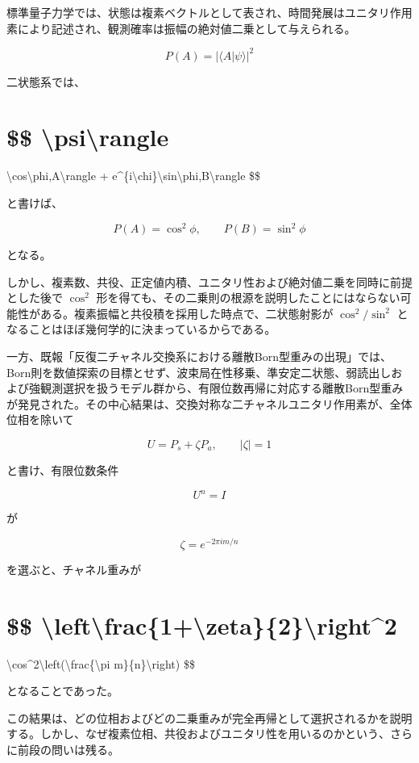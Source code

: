 \documentclass[
  a4paper,
  10pt]{article}
\begin{document}
標準量子力学では、状態は複素ベクトルとして表され、時間発展はユニタリ作用素により記述され、観測確率は振幅の絶対値二乗として与えられる。

\[
P(A)=|\langle A|\psi\rangle|^2
\]

二状態系では、

\section{\$\$
\textbar\textbackslash psi\textbackslash rangle}\label{-psirangle}

\textbackslash cos\textbackslash phi,\textbar A\textbackslash rangle +
e\^{}\{i\textbackslash chi\}\textbackslash sin\textbackslash phi,\textbar B\textbackslash rangle
\$\$

と書けば、

\[
P(A)=\cos^2\phi,
\qquad
P(B)=\sin^2\phi
\]

となる。

しかし、複素数、共役、正定値内積、ユニタリ性および絶対値二乗を同時に前提とした後で
\(\cos^2\)
形を得ても、その二乗則の根源を説明したことにはならない可能性がある。複素振幅と共役積を採用した時点で、二状態射影が
\(\cos^2/\sin^2\) となることはほぼ幾何学的に決まっているからである。

一方、既報「反復二チャネル交換系における離散Born型重みの出現」では、Born則を数値探索の目標とせず、波束局在性移乗、準安定二状態、弱読出しおよび強観測選択を扱うモデル群から、有限位数再帰に対応する離散Born型重みが発見された。その中心結果は、交換対称な二チャネルユニタリ作用素が、全体位相を除いて

\[
U=P_s+\zeta P_a,
\qquad |\zeta|=1
\]

と書け、有限位数条件

\[
U^n=I
\]

が

\[
\zeta=e^{-2\pi im/n}
\]

を選ぶと、チャネル重みが

\section{\$\$
\textbackslash left\textbar\textbackslash frac\{1+\textbackslash zeta\}\{2\}\textbackslash right\textbar\^{}2}\label{-leftfrac1zeta2right2}

\textbackslash cos\^{}2\textbackslash left(\textbackslash frac\{\textbackslash pi
m\}\{n\}\textbackslash right) \$\$

となることであった。

この結果は、どの位相およびどの二乗重みが完全再帰として選択されるかを説明する。しかし、なぜ複素位相、共役およびユニタリ性を用いるのかという、さらに前段の問いは残る。
\end{document}
